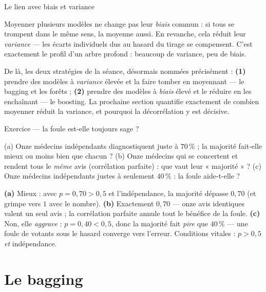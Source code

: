 \documentclass[aspectratio=169,11pt]{beamer}
\begin{document}
\begin{frame}{Le lien avec biais et variance}
\begin{ucaddef}
{\small Moyenner plusieurs modèles ne change pas leur \emph{biais} commun : si tous se trompent dans le même sens, la moyenne aussi. En revanche, cela réduit leur \emph{variance} — les écarts individuels dus au hasard du tirage se compensent. C'est exactement le profil d'un arbre profond : beaucoup de variance, peu de biais.}
\end{ucaddef}
{\small De là, les deux stratégies de la séance, désormais nommées précisément : \textbf{(1)} prendre des modèles à \emph{variance} élevée et la faire tomber en moyennant — le bagging et les forêts ; \textbf{(2)} prendre des modèles à \emph{biais} élevé et le réduire en les enchaînant — le boosting. La prochaine section quantifie exactement de combien moyenner réduit la variance, et pourquoi la décorrélation y est décisive.}
\end{frame}

\begin{frame}{Exercice — la foule est-elle toujours sage ?}
\begin{ucadrec}[Énoncé]
{\small (a) Onze médecins indépendants diagnostiquent juste à $70\,\%$ ; la majorité fait-elle mieux ou moins bien que chacun ? (b) Onze médecins qui se concertent et rendent tous le \emph{même} avis (corrélation parfaite) : que vaut leur « majorité » ? (c) Onze médecins indépendants justes à seulement $40\,\%$ : la foule aide-t-elle ?}
\end{ucadrec}
\pause
\begin{ucadex}[Correction]
{\small \textbf{(a)} Mieux : avec $p = 0{,}70 > 0{,}5$ et l'indépendance, la majorité dépasse $0{,}70$ (et grimpe vers $1$ avec le nombre). \textbf{(b)} Exactement $0{,}70$ — onze avis identiques valent un seul avis ; la corrélation parfaite annule tout le bénéfice de la foule. \textbf{(c)} Non, elle \emph{aggrave} : $p = 0{,}40 < 0{,}5$, donc la majorité fait \emph{pire} que $40\,\%$ — une foule de votants sous le hasard converge vers l'erreur. Conditions vitales : $p > 0{,}5$ \emph{et} indépendance.}
\end{ucadex}
\end{frame}

\section{Le bagging}
\end{document}
